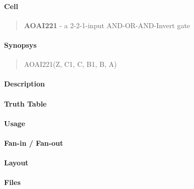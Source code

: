 \label{AOAI221}
\paragraph{Cell}
\begin{quote}
    \textbf{AOAI221} - a 2-2-1-input AND-OR-AND-Invert gate
\end{quote}

\paragraph{Synopsys}
\begin{quote}
    AOAI221(Z, C1, C, B1, B, A)
\end{quote}

\paragraph{Description}

%

\paragraph{Truth Table}
%

\paragraph{Usage}

\paragraph{Fan-in / Fan-out}

\paragraph{Layout}

\paragraph{Files}
